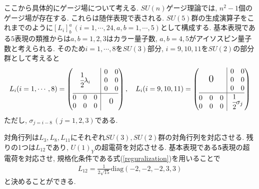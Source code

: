ここから具体的にゲージ場について考える.
$SU(n)$ゲージ理論では, $n^2-1$個のゲージ場が存在する.
これらは随伴表現で表される.
$SU(5)$群の生成演算子をこれまでのように$[L_i]^a_b\,(i=1,\cdots,24, a,b=1,\cdots,5)$として構成する.
基本表現である$5$表現の類推からは$a,b=1,2,3$はカラー量子数, $a,b=4,5$がアイソスピン量子数と考えられる.
そのため$i=1,\cdots,8$を$SU(3)$部分, $i=9,10,11$を$SU(2)$の部分群として考えると
\begin{align}
  L_i(i=1,\cdots,8) = \left(\begin{array}{@{}c|c@{}}
      \mbox{$\cfrac{1}{2}\lambda_i$} &
      \begin{matrix}
        0 & 0 \\
        0 & 0 \\
        0 & 0 
      \end{matrix}\\
      \hline
      \begin{matrix}
        0 & 0 & 0\\
        0 & 0 & 0
      \end{matrix} &{\large{\mbox{$0$}}}
  \end{array}\right),\quad
  L_i(i=9,10,11) = \left(\begin{array}{@{}c|c@{}}
      \mbox{\Large 0} &
      \begin{matrix}
        0 & 0 \\
        0 & 0 \\
        0 & 0 
      \end{matrix}\\
      \hline
      \begin{matrix}
        0 & 0 & 0\\
        0 & 0 & 0
      \end{matrix} & {\mbox{$\cfrac{1}{2}\sigma_j$}}
  \end{array}\right)
\end{align}
ただし, $\sigma_{j=i-8}\,(j=1,2,3)$である.

対角行列は$L_3, L_8, L_{11}$にそれぞれ$SU(3), SU(2)$群の対角行列を対応させる.
残りの1つは$L_{12}$であり, $U(1)_Y$の超電荷を対応させる.
基本表現である$\bm{5}$表現の超電荷を対応させ, 規格化条件である式(\ref{reguralization})を用いることで
\begin{align}
  L_{12}=\frac{1}{2\sqrt{15}}\mathrm{diag}(-2,-2,-2,3,3)\nonumber
\end{align}
と決めることができる.


